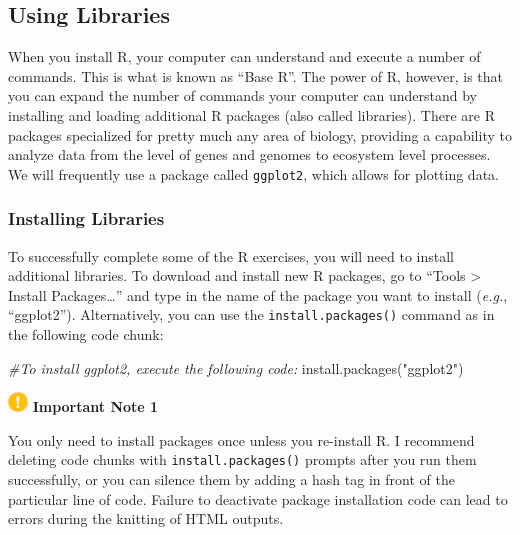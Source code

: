 \documentclass[
]{book}
\newenvironment{Shaded}{\begin{snugshade}}{\end{snugshade}}
\newcommand{\AttributeTok}[1]{\textcolor[rgb]{0.77,0.63,0.00}{#1}}
\newcommand{\CommentTok}[1]{\textcolor[rgb]{0.56,0.35,0.01}{\textit{#1}}}
\newcommand{\NormalTok}[1]{#1}
\newcommand{\StringTok}[1]{\textcolor[rgb]{0.31,0.60,0.02}{#1}}
\begin{document}
\hypertarget{libraries}{%
\subsection{Using Libraries}\label{libraries}}

When you install R, your computer can understand and execute a number of commands. This is what is known as ``Base R''. The power of R, however, is that you can expand the number of commands your computer can understand by installing and loading additional R packages (also called libraries). There are R packages specialized for pretty much any area of biology, providing a capability to analyze data from the level of genes and genomes to ecosystem level processes. We will frequently use a package called \texttt{ggplot2}, which allows for plotting data.

\hypertarget{installing-libraries}{%
\subsubsection*{Installing Libraries}\label{installing-libraries}}

To successfully complete some of the R exercises, you will need to install additional libraries. To download and install new R packages, go to ``Tools \textgreater{} Install Packages\ldots{}'' and type in the name of the package you want to install (\emph{e.g.}, ``ggplot2''). Alternatively, you can use the \texttt{install.packages()} command as in the following code chunk:

\begin{Shaded}
\begin{Highlighting}[]
\CommentTok{\#To install ggplot2, execute the following code:}
\NormalTok{install}\AttributeTok{.packages}\NormalTok{(}\StringTok{"ggplot2"}\NormalTok{)}
\end{Highlighting}
\end{Shaded}

\includegraphics[width=0.20833in,height=\textheight]{images/important.png} \textbf{Important Note 1}

You only need to install packages once unless you re-install R. I recommend deleting code chunks with \texttt{install.packages()} prompts after you run them successfully, or you can silence them by adding a hash tag in front of the particular line of code. Failure to deactivate package installation code can lead to errors during the knitting of HTML outputs.
\end{document}
